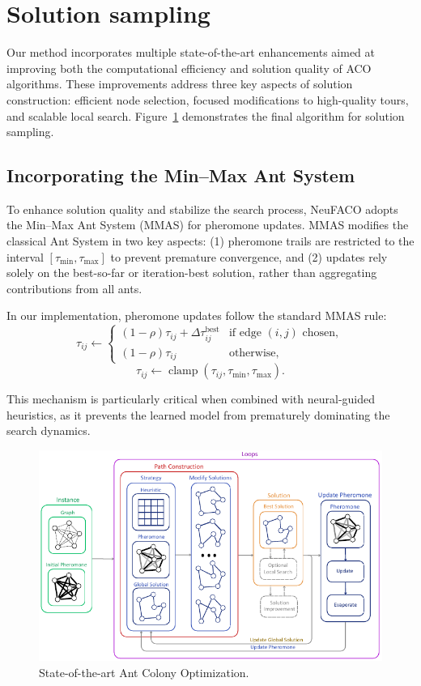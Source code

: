 \documentclass[a4paper,conference]{IEEEtran}
\begin{document}
\section{Solution sampling}
Our method incorporates multiple state-of-the-art enhancements aimed at improving both the computational efficiency and solution quality of ACO algorithms. These improvements address three key aspects of solution construction: efficient node selection, focused modifications to high-quality tours, and scalable local search. Figure~\ref{fig:FACO} demonstrates the final algorithm for solution sampling.

\subsection{Incorporating the Min--Max Ant System}
To enhance solution quality and stabilize the search process, NeuFACO adopts the Min--Max Ant System (MMAS) \cite{MMAS} for pheromone updates. MMAS modifies the classical Ant System in two key aspects: (1) pheromone trails are restricted to the interval $[\tau_{\min},\tau_{\max}]$ to prevent premature convergence, and (2) updates rely solely on the best-so-far or iteration-best solution, rather than aggregating contributions from all ants.

In our implementation, pheromone updates follow the standard MMAS rule:
\begin{equation}
\tau_{ij} \leftarrow \begin{cases}
(1-\rho)\tau_{ij} + \Delta\tau_{ij}^{\text{best}} & \text{if edge }(i,j) \text{ chosen},\\
(1-\rho)\tau_{ij} & \text{otherwise},
\end{cases}
\end{equation}
\begin{equation}
\tau_{ij} \leftarrow \operatorname{clamp}(\tau_{ij},\tau_{\min},\tau_{\max}).
\end{equation}

This mechanism is particularly critical when combined with neural-guided heuristics, as it prevents the learned model from prematurely dominating the search dynamics.

\begin{figure}[!htb]
  \centering
  \includegraphics[width=\linewidth]{FACO.pdf}
  \caption{State-of-the-art Ant Colony Optimization.}
  \label{fig:FACO}
\end{figure}
\end{document}
